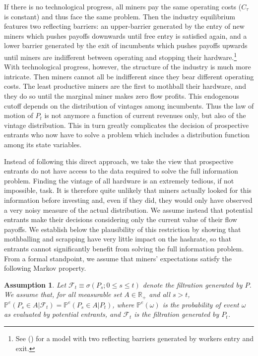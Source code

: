 \documentclass[12pt, a4paper]{article}
\newtheorem{hyp}{Assumption}
\begin{document}
If there is no technological progress, all miners pay the same operating
costs ($C_{\tau}$ is constant) and thus face the same problem. Then the
industry equilibrium features two reflecting barriers: an upper-barrier
generated by the entry of new miners which pushes payoffs downwards until free
entry is satisfied again, and a lower barrier generated by the exit of
incumbents which pushes payoffs upwards until miners are indifferent between
operating and stopping their hardware.\footnote{%
See \citeauthor{Alvarez} (\citeyear{Alvarez}) for a model with two
reflecting barriers generated by workers entry and exit.} With technological
progress, however, the structure of the industry is much more intricate. Then miners
cannot all be indifferent since they bear different operating costs. The
least productive miners are the first to mothball their hardware, and they
do so until the marginal miner makes zero flow profits. This endogenous
cutoff depends on the distribution of vintages among incumbents. Thus the
law of motion of $P_t$ is not anymore a function of current revenues only, but
also of the vintage distribution. This in turn greatly complicates the
decision of prospective entrants who now have to solve a problem which
includes a distribution function among its state variables.

Instead of following this direct approach, we take the view that
prospective entrants do not have access to the data required to solve the
full information problem. Finding the vintage of all hardware is an
extremely tedious, if not impossible, task. It is therefore quite unlikely
that miners actually looked for this information before investing and, even
if they did, they would only have observed a very noisy measure of the
actual distribution. We assume instead that potential entrants make their
decisions considering only the current value of their flow payoffs. We
establish below the plausibility of this restriction by showing that
mothballing and scrapping have very little impact on the hashrate, so
that entrants cannot significantly benefit from solving the full information
problem. From a formal standpoint, we assume that miners' expectations
satisfy the following Markov property.

\begin{hyp}
\label{hyp:miners_myopic} Let $\mathcal{F}_t\equiv\sigma(P_s;0\leq s \leq t)$
denote the filtration generated by $P$. We assume that, for all measurable
set $A \in \mathbb{R}_+$ and all $s>t$, $\mathbb{P}^e\left(P_s \in A|\mathcal{F}%
_t\right)=\mathbb{P}^e\left(P_s \in A|P_t\right)$, where $\mathbb{P}^e(\omega)$ is the
probability of event $\omega$ as evaluated by potential entrants, and $\mathcal{F}_t$
is the filtration generated by $P_t$.
\end{hyp}
\end{document}
